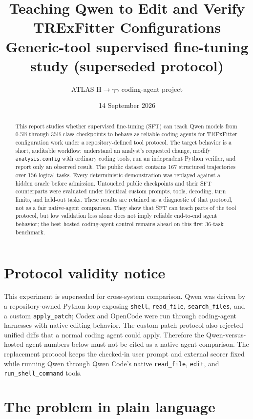 \documentclass[11pt]{article}
\title{Teaching Qwen to Edit and Verify TRExFitter Configurations\\
\large Generic-tool supervised fine-tuning study (superseded protocol)}
\author{ATLAS H$\rightarrow\gamma\gamma$ coding-agent project}
\date{14 September 2026}
\newcommand{\code}[1]{\texttt{#1}}
\begin{document}
\maketitle

\begin{abstract}
This report studies whether supervised fine-tuning (SFT) can teach Qwen models
from 0.5B through 35B-class checkpoints to behave as reliable coding agents for TRExFitter
configuration work under a repository-defined tool protocol.  The target behavior is a short, auditable workflow:
understand an analyst's requested change, modify \code{analysis.config} with
ordinary coding tools, run an independent Python verifier, and report only an
observed result.  The public dataset contains 167 structured trajectories over
156 logical tasks.  Every deterministic demonstration was replayed against a
hidden oracle before admission.  Untouched public checkpoints and their SFT
counterparts were evaluated under identical custom prompts, tools, decoding,
turn limits, and held-out tasks.  These results are retained as a diagnostic
of that protocol, not as a fair native-agent comparison.  They show that SFT can teach parts of the
tool protocol, but low validation loss alone does not imply reliable end-to-end
agent behavior; the best hosted coding-agent control remains ahead on this
first 36-task benchmark.
\end{abstract}

\section*{Protocol validity notice}

This experiment is superseded for cross-system comparison.  Qwen was driven by
a repository-owned Python loop exposing \code{shell}, \code{read\_file},
\code{search\_files}, and a custom \code{apply\_patch}; Codex and OpenCode were
run through coding-agent harnesses with native editing behavior.  The custom
patch protocol also rejected unified diffs that a normal coding agent could
apply.  Therefore the Qwen-versus-hosted-agent numbers below must not be cited
as a native-agent comparison.  The replacement protocol keeps the checked-in
user prompt and external scorer fixed while running Qwen through Qwen Code's
native \code{read\_file}, \code{edit}, and \code{run\_shell\_command} tools.

\section{The problem in plain language}
\end{document}
